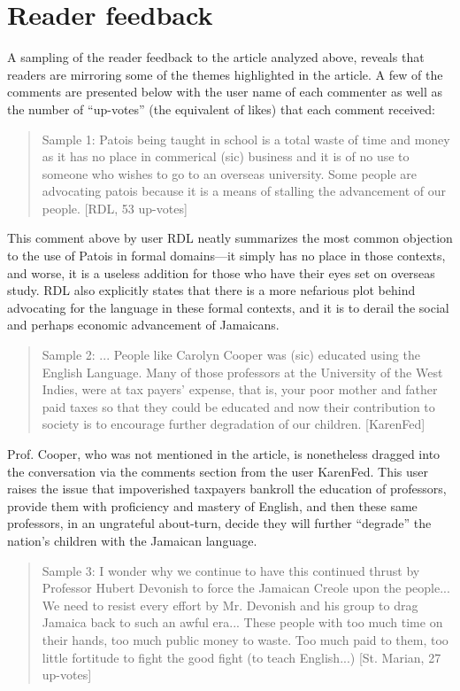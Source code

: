 \documentclass[output=paper,colorlinks,citecolor=brown]{langscibook}
\begin{document}
\section{Reader feedback}

A sampling of the reader feedback to the article analyzed above, reveals that readers are mirroring some of the themes highlighted in the article. A few of the comments are presented below with the user name of each commenter as well as the number of “up-votes” (the equivalent of likes) that each comment received: 

\begin{quote}
    Sample 1: Patois being taught in school is a total waste of time and money as it has no place in commerical (sic) business and it is of no use to someone who wishes to go to an overseas university. Some people are advocating patois because it is a means of stalling the advancement of our people. [RDL, 53 up-votes]
\end{quote}

This comment above by user RDL neatly summarizes the most common objection to the use of Patois in formal domains—it simply has no place in those contexts, and worse, it is a useless addition for those who have their eyes set on overseas study. RDL also explicitly states that there is a more nefarious plot behind advocating for the language in these formal contexts, and it is to derail the social and perhaps economic advancement of Jamaicans. 

\begin{quote}
    Sample 2: ... People like Carolyn Cooper was (sic) educated using the English Language. Many of those professors at the University of the West Indies, were at tax payers’ expense, that is, your poor mother and father paid taxes so that they could be educated and now their contribution to society is to encourage further degradation of our children. [KarenFed]
\end{quote}

Prof. Cooper, who was not mentioned in the article, is nonetheless dragged into the conversation via the comments section from the user KarenFed. This user raises the issue that impoverished taxpayers bankroll the education of professors, provide them with proficiency and mastery of English, and then these same professors, in an ungrateful about-turn, decide they will further “degrade” the nation’s children with the Jamaican language.

\begin{quote}
    Sample 3: I wonder why we continue to have this continued thrust by Professor Hubert Devonish to force the Jamaican Creole upon the people... We need to resist every effort by Mr. Devonish and his group to drag Jamaica back to such an awful era... These people with too much time on their hands, too much public money to waste. Too much paid to them, too little fortitude to fight the good fight (to teach English...) [St. Marian, 27 up-votes]
\end{quote}
\end{document}
